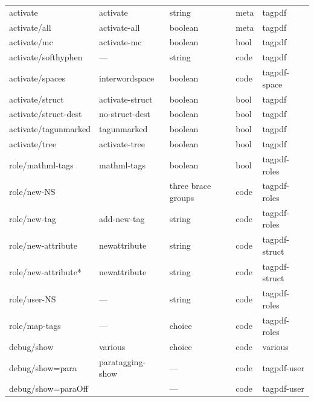 \begin{longtable}{lllll}
activate        & activate        & string         &meta  & tagpdf \\
activate/all    & activate-all    & boolean         &meta & tagpdf\\
activate/mc     & activate-mc     & boolean         &bool  & tagpdf\\
activate/softhyphen & ---         & string          &code  & tagpdf \\    
activate/spaces & interwordspace  & boolean         &code  & tagpdf-space\\
activate/struct & activate-struct & boolean         &bool  & tagpdf\\  
activate/struct-dest & no-struct-dest&boolean       &bool  & tagpdf\\
activate/tagunmarked& tagunmarked & boolean         &bool & tagpdf\\
activate/tree   & activate-tree   & boolean         &bool  & tagpdf\\[4pt]\midrule  
role/mathml-tags & mathml-tags    & boolean          &bool  & tagpdf-roles\\
role/new-NS      &                & three brace groups& code &tagpdf-roles\\
role/new-tag     & add-new-tag    & string           &code  & tagpdf-roles\\
role/new-attribute&newattribute   & string           &code  & tagpdf-struct\\
role/new-attribute*&newattribute   & string           &code  & tagpdf-struct\\
role/user-NS     & ---            & string           &code  & tagpdf-roles\\ 
role/map-tags      & ---            & choice           & code & tagpdf-roles\\[4pt]\midrule
debug/show       &various          &choice            &code  & various \\ 
debug/show=para  & paratagging-show&    ---           &code  & tagpdf-user\\
debug/show=paraOff&                &    ---           &code  & tagpdf-user\\

\end{longtable}

